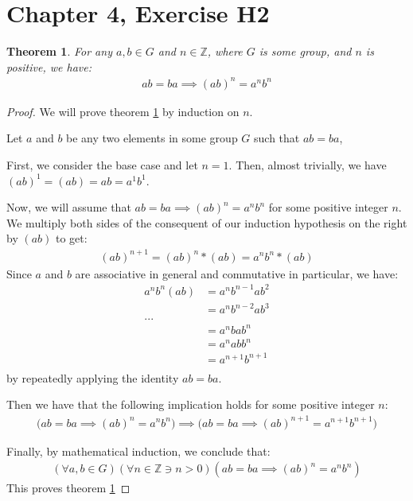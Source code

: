 \documentclass[12pt]{article}
\newcommand{\ints}{\mathbb{Z}}
\newtheorem{thm}{Theorem}
\begin{document}
\section{Chapter 4, Exercise H2}

\begin{thm} \label{thm:7}
	For any $a, b\in G$ and $n \in \ints$,
	where $G$ is some group,
	and $n$ is positive,
	we have:
	\begin{align}
		ab = ba \implies (ab)^n = a^n b^n
	\end{align}
\end{thm}

\begin{proof}
	We will prove theorem \ref{thm:7} by induction on $n$.

	Let $a$ and $b$ be any two elements in some group $G$
	such that $ab = ba$,

	First, we consider the base case and let $n = 1$.
	Then, almost trivially, we have $(ab)^1 = (ab) = ab = a^1 b^1$.

	Now, we will assume that $ab = ba \implies (ab)^n = a^n b^n$
	for some positive integer $n$.
	We multiply both sides
	of the consequent of our induction hypothesis
	on the right by $(ab)$
	to get:
	\begin{align}
		(ab)^{n+1} = (ab)^n * (ab) = a^n b^n * (ab)
	\end{align}
	Since $a$ and $b$ are
	associative in general
	and commutative in particular,
	we have:
	\begin{align}
		a^n b^n (ab)
		& = a^n b^{n-1}ab^2 \\
		& = a^n b^{n-2}ab^3 \\
		... \\
		& = a^n bab^n \\
		& = a^n abb^n \\
		& = a^{n+1} b^{n+1} \\
	\end{align}
	by repeatedly applying the identity $ab = ba$.

	Then we have that the following implication holds for some positive integer $n$:
	\begin{align}
		\Bigg( ab = ba \implies (ab)^n = a^n b^n \Bigg) \implies  \Bigg( ab = ba \implies (ab)^{n+1} = a^{n+1} b^{n+1} \Bigg) 
	\end{align}

	Finally,
	by mathematical induction,
	we conclude that:
	\begin{align}
		(\forall a,b \in G)(\forall n \in \ints \ni n > 0)(ab = ba \implies (ab)^n = a^n b^n)
	\end{align}
	This proves theorem \ref{thm:7}	
\end{proof}
\end{document}
